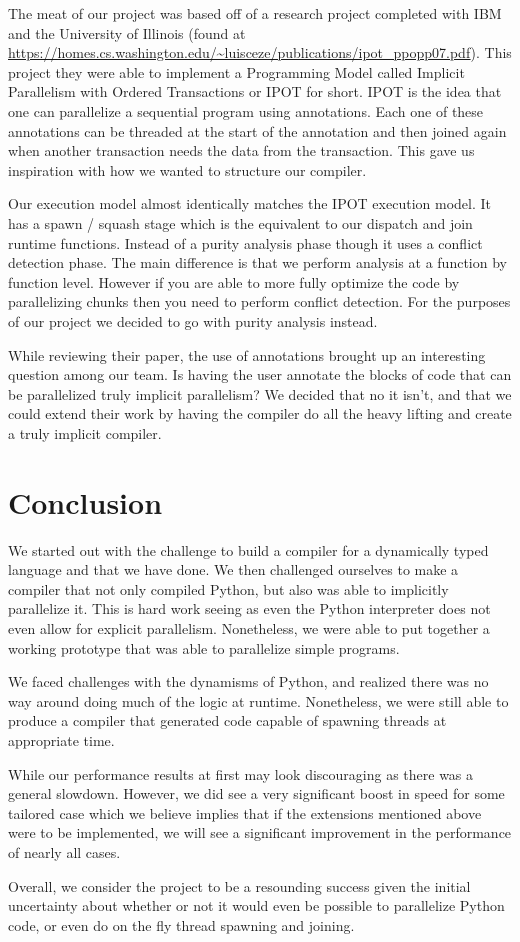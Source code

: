 \documentclass{acm_proc_article-sp}
\begin{document}
The meat of our project was based off of a research project completed with IBM
and the University of Illinois (found at \url{https://homes.cs.washington.edu/~luisceze/publications/ipot_ppopp07.pdf}). This project they were able to implement a
Programming Model called Implicit Parallelism with Ordered Transactions or IPOT
for short.  IPOT is the idea that one can parallelize a sequential program
using annotations. Each one of these annotations can be threaded at the start
of the annotation and then joined again when another transaction needs the data
from the transaction.  This gave us inspiration with how we wanted to structure
our compiler.

Our execution model almost identically matches the IPOT execution model. It has
a spawn / squash stage which is the equivalent to our dispatch and join runtime
functions. Instead of a purity analysis phase though it uses a conflict
detection phase. The main difference is that we perform analysis at a function
by function level. However if you are able to more fully optimize the code by
parallelizing chunks then you need to perform conflict detection. For the
purposes of our project we decided to go with purity analysis instead.

While reviewing their paper, the use of annotations brought up an interesting
question among our team. Is having the user annotate the blocks of code that
can be parallelized truly implicit parallelism? We decided that no it isn't,
and that we could extend their work by having the compiler do all the heavy
lifting and create a truly implicit compiler.

\section*{Conclusion}

We started out with the challenge to build a compiler for a dynamically typed
language and that we have done. We then challenged ourselves to make a compiler
that not only compiled Python, but also was able to implicitly parallelize it.
This is hard work seeing as even the Python interpreter does not even allow for
explicit parallelism. Nonetheless, we were able to put together a working prototype
that was able to parallelize simple programs.

We faced challenges with the dynamisms of Python, and realized there was no way
around doing much of the logic at runtime. Nonetheless, we were still able to
produce a compiler that generated code capable of spawning threads at appropriate time.

While our performance results at first may look discouraging as there was a general
slowdown. However, we did see a very significant boost in speed for some tailored case
which we believe implies that if the extensions mentioned above were to be implemented,
we will see a significant improvement in the performance of nearly all cases.

Overall, we consider the project to be a resounding success given the initial uncertainty
about whether or not it would even be possible to parallelize Python code, or even do
on the fly thread spawning and joining.
\end{document}
